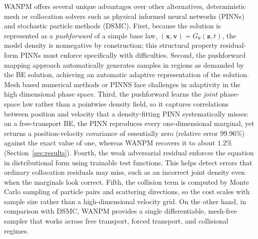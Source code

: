 \documentclass[11pt]{article}
\newcommand{\vx}{\mathbf{x}}
\newcommand{\vv}{\mathbf{v}}
\newcommand{\vz}{\mathbf{z}}
\theoremstyle{plain}
\begin{document}
WANPM offers several unique advantages over other  alternatives, deterministic mesh or collocation solvers such as physical informed neural networks (PINNs) and stochastic particle methods (DSMC). First, because the solution is represented as a \emph{pushforward} of a simple base law, $(\vx,\vv)=G_\theta(\vz,t)$, the model density is nonnegative by construction; this structural property residual-form PINNs must enforce specifically with difficulties. Second, the pushforward mapping approach automatically generates samples in regions as demanded by the BE solution, achieving an automatic adaptive representation of the solution. Mesh based numerical methods or PINNS face challenges in adaptivity in the high dimensional phase space. Third, the pushforward learns the \emph{joint} phase-space law rather than a pointwise density field, so it captures correlations between position and velocity that a density-fitting PINN systematically misses: on a free-transport BE, the PINN reproduces every one-dimensional marginal, yet returns a position-velocity covariance of essentially zero (relative error $99.96\%$) against the exact value of one, whereas WANPM recovers it to about $1.2\%$ (Section~\ref{sec:results}). Fourth, the weak adversarial residual enforces the equation in distributional form using trainable test functions. This helps detect errors that ordinary collocation residuals may miss, such as an incorrect joint density even when the marginals look correct. Fifth, the collision term is computed by Monte Carlo sampling of particle pairs and scattering directions, so the cost scales with sample size rather than a high-dimensional velocity grid. On the other hand, in comparison with DSMC, WANPM provides a single differentiable, mesh-free sampler that works across free transport, forced transport, and collisional regimes.








\end{document}

